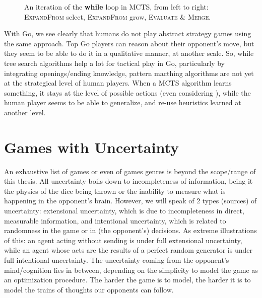 \begin{figure}
\begin{center}
\caption{An iteration of the \textbf{while} loop in MCTS, from left to right:
\textsc{ExpandFrom} select, \textsc{ExpandFrom} grow, \textsc{Evaluate} \& \textsc{Merge}.}
\label{fig:MCTS}
\end{center}
\end{figure}

With Go, we see clearly that humans do not play abstract strategy games using the same approach. Top Go players can reason about their opponent's move, but they seem to be able to do it in a qualitative manner, at another scale. So, while tree search algorithms help a lot for tactical play in Go, particularly by integrating openings/ending knowledge, pattern macthing algorithms are not yet at the strategical level of human players. When a MCTS algorithm learns something, it stays at the level of possible actions (even considering ), while the human player seems to be able to generalize, and re-use heuristics learned at another level.


\section{Games with Uncertainty}
An exhaustive list of games or even of games genres is beyond the scope/range of this thesis. %
All uncertainty boils down to incompleteness of information, being it the physics of the dice being thrown or the inability to measure what is happening in the opponent's brain. However,  we will speak of 2 types (sources) of uncertainty: extensional uncertainty, which is due to incompleteness in direct, measurable information, and intentional uncertainty, which is related to randomness in the game or in (the opponent's) decisions. As extreme illustrations of this: an agent acting without sending is under full extensional uncertainty, while an agent whose acts are the results of a perfect random generator is under full intentional uncertainty. The uncertainty coming from the opponent's mind/cognition lies in between, depending on the simplicity to model the game as an optimization procedure. The harder the game is to model, the harder it is to model the trains of thoughts our opponents can follow.

